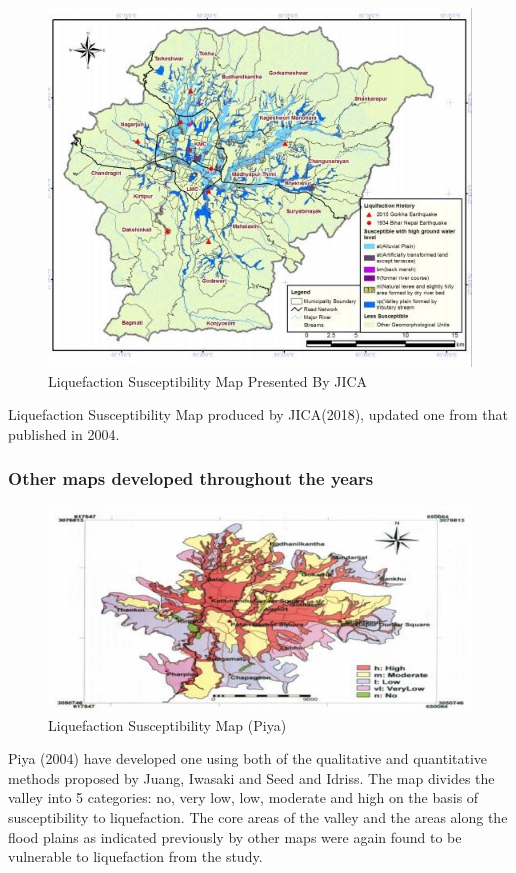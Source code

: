 \begin{figure}[!hbt]
\centering
\includegraphics[width=0.75\linewidth,keepaspectratio]{images/main/jica_sus.jpg}
\caption{Liquefaction Susceptibility Map Presented By JICA}
\end{figure}

Liquefaction Susceptibility Map produced by JICA(2018), updated one from that published in 2004.

\subsubsection{Other maps developed throughout the years}

\begin{figure}[!hbt]
\centering
\includegraphics[width=0.75\linewidth,keepaspectratio]{images/main/piya.png}
\caption{ Liquefaction Susceptibility Map (Piya)}
\end{figure}

Piya (2004) have developed one using both of the qualitative and quantitative methods proposed by Juang\cite{r25}, Iwasaki\cite{r26} and Seed and Idriss\cite{r12}. The map divides the valley into 5 categories: no, very low, low, moderate and high on the basis of susceptibility to liquefaction. The core areas of the valley and the areas along the flood plains as indicated previously by other maps were again found to be vulnerable to liquefaction from the study.

